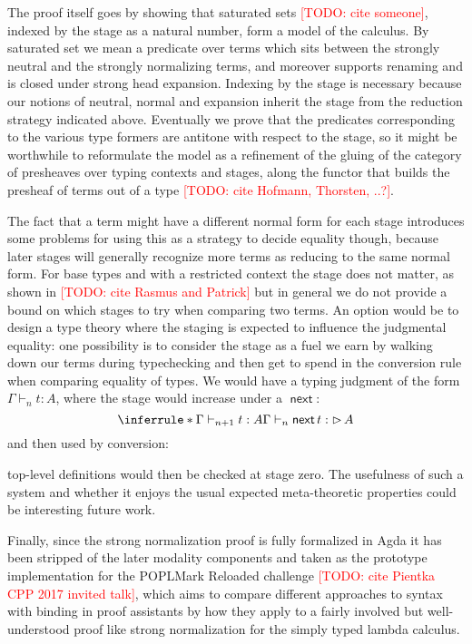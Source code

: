 \documentclass{book}
\newcommand{\TODO}[1]{\textcolor{red}{[TODO: #1]}}
\DeclareMathOperator{\Later}{\vartriangleright}
\DeclareMathOperator{\next}{\ensuremath{\mathsf{next}}}
\begin{document}
  The proof itself goes by showing that saturated sets \TODO{cite someone},
  indexed by the stage as a natural number, form a model of the
  calculus. By saturated set we mean a predicate over terms which sits
  between the strongly neutral and the strongly normalizing terms, and
  moreover supports renaming and is closed under strong head
  expansion. Indexing by the stage is necessary because our notions
  of neutral, normal and expansion inherit the stage from the
  reduction strategy indicated above.
  Eventually we prove that the predicates corresponding to the various
  type formers are antitone with respect to the stage, so it might be
  worthwhile to reformulate the model as a refinement of the gluing of
  the category of presheaves over typing contexts and stages, along the functor that
  builds the presheaf of terms out of a type \TODO{cite Hofmann, Thorsten, ..?}.

  The fact that a term might have a different normal form for each
  stage introduces some problems for using this as a strategy to
  decide equality though, because later stages will generally
  recognize more terms as reducing to the same normal form.
  For base types and with a restricted context the stage does not
  matter, as shown in \TODO{cite Rasmus and Patrick} but in general we do
  not provide a bound on which stages to try when comparing two terms.
  An option would be to design a type theory where the staging is expected
  to influence the judgmental equality: one possibility is to consider
  the stage as a fuel we earn by walking down our terms during
  typechecking and then get to spend in the conversion rule when
  comparing equality of types.
  We would have a typing judgment of the form $\Gamma \vdash_n t : A$, where the stage would increase under a $\next$:
  \[
  \inferrule*{\Gamma \vdash_{n+1} t : A}
             {\Gamma \vdash_n \next t : \Later A}
  \]
  and then used by conversion:
  top-level definitions would then be checked at stage zero. The
  usefulness of such a system and whether it enjoys the usual expected
  meta-theoretic properties could be interesting future work.

  Finally, since the strong normalization proof is fully formalized in
  Agda it has been stripped of the later modality components and taken
  as the prototype implementation for the POPLMark Reloaded challenge
  \TODO{cite Pientka CPP 2017 invited talk},
  which aims to compare different approaches to syntax with binding in
  proof assistants by how they apply to a fairly involved but
  well-understood proof like strong normalization for the simply typed
  lambda calculus.
\end{document}

